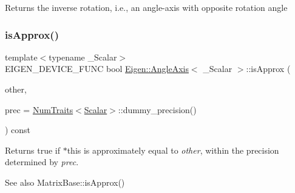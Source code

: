 \begin{DoxyReturn}{Returns}
the inverse rotation, i.\+e., an angle-\/axis with opposite rotation angle 
\end{DoxyReturn}
\mbox{\label{class_eigen_1_1_angle_axis_a3f219c579dbdce81add9299b8d3938ae}} 
\subsubsection{\texorpdfstring{isApprox()}{isApprox()}}
{\footnotesize\ttfamily template$<$typename \+\_\+\+Scalar$>$ \\
E\+I\+G\+E\+N\+\_\+\+D\+E\+V\+I\+C\+E\+\_\+\+F\+U\+NC bool \mbox{\hyperlink{class_eigen_1_1_angle_axis}{Eigen\+::\+Angle\+Axis}}$<$ \+\_\+\+Scalar $>$\+::is\+Approx (\begin{DoxyParamCaption}\item[{const \mbox{\hyperlink{class_eigen_1_1_angle_axis}{Angle\+Axis}}$<$ \+\_\+\+Scalar $>$ \&}]{other,  }\item[{const typename \mbox{\hyperlink{struct_eigen_1_1_num_traits}{Num\+Traits}}$<$ \mbox{\hyperlink{class_eigen_1_1_angle_axis_acd9b10692d7d726b28670e4d3a282fe8}{Scalar}} $>$\+::Real \&}]{prec = {\ttfamily \mbox{\hyperlink{struct_eigen_1_1_num_traits}{Num\+Traits}}$<$\mbox{\hyperlink{class_eigen_1_1_angle_axis_acd9b10692d7d726b28670e4d3a282fe8}{Scalar}}$>$\+:\+:dummy\+\_\+precision()} }\end{DoxyParamCaption}) const\hspace{0.3cm}{\ttfamily [inline]}}

\begin{DoxyReturn}{Returns}
{\ttfamily true} if {\ttfamily $\ast$this} is approximately equal to {\itshape other}, within the precision determined by {\itshape prec}.
\end{DoxyReturn}
\begin{DoxySeeAlso}{See also}
Matrix\+Base\+::is\+Approx() 
\end{DoxySeeAlso}
\mbox{\label{class_eigen_1_1_angle_axis_a7eeacfc82c898c9997814abf56b12613}} 
